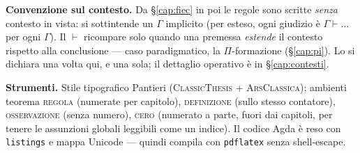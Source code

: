 \documentclass[
  oneside,
  openany,
  titlepage,
  11pt,
  a4paper,
  italian,
  DIV=14,
  headinclude,
  footinclude=true,
  cleardoublepage=empty
]{scrbook}
\theoremstyle{ctplain}
\theoremstyle{ctdef}
\theoremstyle{ctrem}
\theoremstyle{ctcero}
\begin{document}
\medskip

\noindent\textbf{Convenzione sul contesto.} Da \S\ref{cap:fiec} in poi le regole sono scritte \emph{senza} contesto in vista: si sottintende un $\Gamma$ implicito (per esteso, ogni giudizio \`e $\Gamma \vdash \dots$ per ogni $\Gamma$). Il $\vdash$ ricompare solo quando una premessa \emph{estende} il contesto rispetto alla conclusione --- caso paradigmatico, la $\Pi$-formazione (\S\ref{cap:pi}). Lo si dichiara una volta qui, e una sola; il dettaglio operativo \`e in \S\ref{cap:contesti}.

\bigskip

\noindent\textbf{Strumenti.} Stile tipografico Pantieri (\textsc{ClassicThesis} + \textsc{ArsClassica}); ambienti teorema \textsc{regola} (numerate per capitolo), \textsc{definizione} (sullo stesso contatore), \textsc{osservazione} (senza numero), \textsc{cero} (numerato a parte, fuori dai capitoli, per tenere le assunzioni globali leggibili come un indice). Il codice Agda \`e reso con \texttt{listings} e mappa Unicode --- quindi compila con \texttt{pdflatex} senza shell-escape.

\clearpage

{\setlength{\parskip}{0pt}\tableofcontents}
\clearpage

\pagestyle{scrheadings}






\appendix



\end{document}
